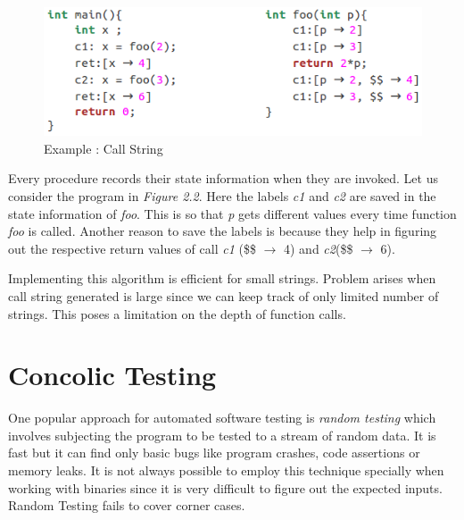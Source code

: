 \documentclass[12pt,oneside]{book}
\begin{document}
\begin{figure}[htbp]
\centering
\includegraphics[scale=0.6]{callString.png}
\caption{Example : Call String}
\end{figure}  
 
Every procedure records their state information when they are invoked. Let us consider the program in \textit{Figure 2.2}. Here the labels \textit{c1} and \textit{c2} are saved in the state information of \textit{foo}. This is so that \textit{p} gets different values every time function \textit{foo} is called. Another reason to save the labels is because they help in figuring out the respective return values of call \textit{c1} (\$\$ $\rightarrow$ 4) and \textit{c2}(\$\$ $\rightarrow$ 6).

Implementing this algorithm is efficient for small strings. Problem arises when call string generated is large since we can keep track of only limited number of strings. This poses a limitation on the depth of function calls.



\section {Concolic Testing}

One popular approach for automated software testing is \textit{random testing}\cite{random} which involves subjecting the program to be tested to a stream of random data. It is fast but it can find only basic bugs like program crashes, code assertions or memory leaks. It is not always possible to employ this technique specially when working with binaries since it is very difficult to figure out the expected inputs. Random Testing fails to cover corner cases.\\
\end{document}
